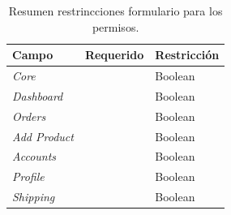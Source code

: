 \begin{table}[H]
    \centering
	\begin{tabular}{ |l|c||l| }
		\hline Campo & Requerido & Restricción \\ \hline
		\multirow{1}{*}{\textit{Core}} 			&  \checkmark 	& Boolean \\ \hline
		\multirow{1}{*}{\textit{Dashboard}} 	&  \checkmark	& Boolean \\ \hline
		\multirow{1}{*}{\textit{Orders}} 		&  \checkmark	& Boolean \\ \hline
		\multirow{1}{*}{\textit{Add Product}} 	&  \checkmark	& Boolean \\ \hline
		\multirow{1}{*}{\textit{Accounts}} 		&  \checkmark	& Boolean \\ \hline
		\multirow{1}{*}{\textit{Profile}} 		&  \checkmark	& Boolean \\ \hline
		\multirow{1}{*}{\textit{Shipping}} 		&  \checkmark	& Boolean \\ \hline
	\end{tabular}
 	\caption{Resumen restrincciones formulario para los permisos.}
    \label{tab:dashboard:account:form:restrictions:account}
\end{table}